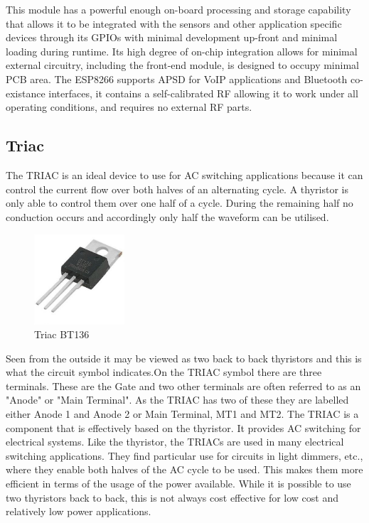         This module has a powerful enough on-board processing and storage capability that allows it to be integrated with the sensors and other application specific devices through its GPIOs with minimal development up-front and minimal loading during runtime. Its high degree of on-chip integration allows for minimal external circuitry, including the front-end module, is designed to occupy minimal PCB area. The ESP8266 supports APSD for VoIP applications and Bluetooth co-existance interfaces, it contains a self-calibrated RF allowing it to work under all operating conditions, and requires no external RF parts.
\subsection{Triac}
The TRIAC is an ideal device to use for AC switching applications because it can control the current flow over both halves of an alternating cycle. A thyristor is only able to control them over one half of a cycle. During the remaining half no conduction occurs and accordingly only half the waveform can be utilised.\\

\begin{figure}
	\includegraphics[width=0.3\textwidth]{photos/theory/bt136.jpg}
	\caption{Triac BT136}
\end{figure}
Seen from the outside it may be viewed as two back to back thyristors and this is what the circuit symbol indicates.On the TRIAC symbol there are three terminals. These are the Gate and two other terminals are often referred to as an "Anode" or "Main Terminal". As the TRIAC has two of these they are labelled either Anode 1 and Anode 2 or Main Terminal, MT1 and MT2.
The TRIAC is a component that is effectively based on the thyristor. It provides AC switching for electrical systems. Like the thyristor, the TRIACs are used in many electrical switching applications. They find particular use for circuits in light dimmers, etc., where they enable both halves of the AC cycle to be used. This makes them more efficient in terms of the usage of the power available. While it is possible to use two thyristors back to back, this is not always cost effective for low cost and relatively low power applications.

